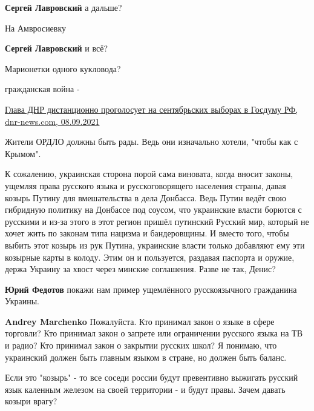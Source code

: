 \begin{itemize}
\begin{itemize} %
\textbf{Сергей Лавровский} а дальше?

На Амвросиевку

\textbf{Сергей Лавровский} и всё?
\end{itemize} %

Марионетки одного кукловода?

гражданская война -

\href{https://dnr-news.com/dnr/57809-glava-dnr-distancionno-progolosuet-na-sentyabrskih-vyborah-v-gosdumu-rf.html}{%
Глава ДНР дистанционно проголосует на сентябрьских выборах в Госдуму РФ, dnr-news.com, 08.09.2021%
}

Жители ОРДЛО должны быть рады. Ведь они изначально хотели, "чтобы как с Крымом".


К сожалению, украинская сторона порой сама виновата, когда вносит законы, ущемляя
права русского языка и русскоговорящего населения страны, давая козырь Путину
для вмешательства в дела Донбасса. Ведь Путин ведёт свою гибридную политику на
Донбассе под соусом, что украинские власти борются с русскими и из-за этого в
этот регион пришёл путинский Русский мир, который не хочет жить по законам типа
нацизма и бандеровщины. И вместо того, чтобы выбить этот козырь из рук
Путина, украинские власти только добавляют ему эти козырные карты в колоду. Этим
он и пользуется, раздавая паспорта и оружие, держа Украину за хвост через минские
соглашения. Разве не так, Денис?

\begin{itemize} %
\textbf{Юрий Федотов} покажи нам пример ущемлённого русскоязычного гражданина Украины.

\textbf{Andrey Marchenko} Пожалуйста. Кто принимал закон о языке в сфере
торговли? Кто принимал закон о запрете или ограничении русского языка на ТВ и
радио? Кто принимал закон о закрытии русских школ? Я понимаю, что украинский
должен быть главным языком в стране, но должен быть баланс.


Если это "козырь" - то все соседи россии будут превентивно выжигать русский
язык каленным железом на своей территории - и будут правы. Зачем давать козыри
врагу?


\end{itemize}
\end{itemize}
